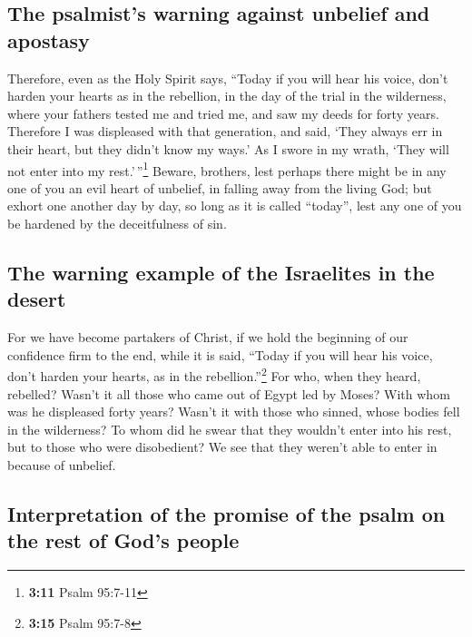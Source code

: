 \hypertarget{the-psalmists-warning-against-unbelief-and-apostasy}{%
\subsection{The psalmist's warning against unbelief and
apostasy}\label{the-psalmists-warning-against-unbelief-and-apostasy}}

 Therefore, even as the Holy Spirit says, ``Today if you
will hear his voice,  don't harden your hearts as in the
rebellion, in the day of the trial in the wilderness, 
where your fathers tested me and tried me, and saw my deeds for forty
years.  Therefore I was displeased with that generation,
and said, `They always err in their heart, but they didn't know my
ways.'  As I swore in my wrath, `They will not enter into
my rest.'\,''\footnote{\textbf{3:11} Psalm 95:7-11} 
Beware, brothers, lest perhaps there might be in any one of you an evil
heart of unbelief, in falling away from the living God; 
but exhort one another day by day, so long as it is called ``today'',
lest any one of you be hardened by the deceitfulness of sin.

\hypertarget{the-warning-example-of-the-israelites-in-the-desert}{%
\subsection{The warning example of the Israelites in the
desert}\label{the-warning-example-of-the-israelites-in-the-desert}}

 For we have become partakers of Christ, if we hold the
beginning of our confidence firm to the end,  while it is
said, ``Today if you will hear his voice, don't harden your hearts, as
in the rebellion.''\footnote{\textbf{3:15} Psalm 95:7-8} 
For who, when they heard, rebelled? Wasn't it all those who came out of
Egypt led by Moses?  With whom was he displeased forty
years? Wasn't it with those who sinned, whose bodies fell in the
wilderness?  To whom did he swear that they wouldn't
enter into his rest, but to those who were disobedient? 
We see that they weren't able to enter in because of unbelief.

\hypertarget{interpretation-of-the-promise-of-the-psalm-on-the-rest-of-gods-people}{%
\subsection{Interpretation of the promise of the psalm on the rest of
God's
people}\label{interpretation-of-the-promise-of-the-psalm-on-the-rest-of-gods-people}}

